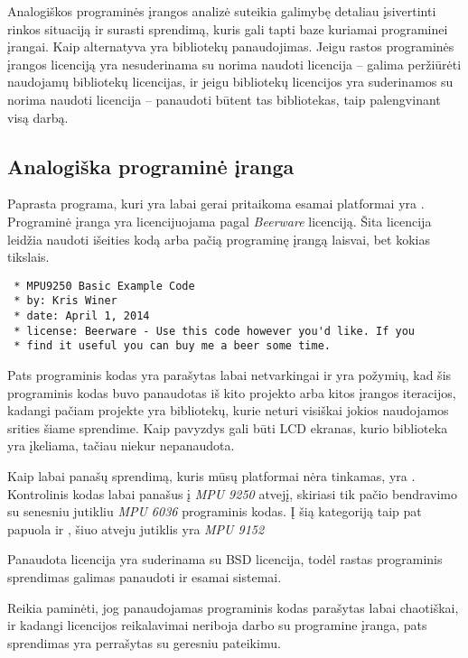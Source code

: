 Analogiškos programinės įrangos analizė suteikia galimybę detaliau įsivertinti rinkos situaciją ir surasti sprendimą, kuris gali tapti baze kuriamai programinei įrangai.
Kaip alternatyva yra bibliotekų panaudojimas.
Jeigu rastos programinės įrangos licenciją yra nesuderinama su norima naudoti licencija -- galima peržiūrėti naudojamų bibliotekų licencijas, ir jeigu bibliotekų licencijos yra suderinamos su norima naudoti licencija -- panaudoti būtent tas bibliotekas, taip palengvinant visą darbą.

\subsection{Analogiška programinė įranga}

Paprasta programa, kuri yra labai gerai pritaikoma esamai platformai yra \cite{MPU9243:online}. Programinė įranga yra licencijuojama pagal \textit{Beerware} licenciją. Šita licencija leidžia naudoti išeities kodą arba pačią programinę įrangą laisvai, bet kokias tikslais.

\begin{verbatim}
 * MPU9250 Basic Example Code
 * by: Kris Winer
 * date: April 1, 2014
 * license: Beerware - Use this code however you'd like. If you
 * find it useful you can buy me a beer some time.
\end{verbatim}

Pats programinis kodas yra parašytas labai netvarkingai ir yra požymių, kad šis programinis kodas buvo panaudotas iš kito projekto arba kitos įrangos iteracijos, kadangi pačiam projekte yra bibliotekų, kurie neturi visiškai jokios naudojamos srities šiame sprendime. Kaip pavyzdys gali būti LCD ekranas, kurio biblioteka yra įkeliama, tačiau niekur nepanaudota.

Kaip labai panašų sprendimą, kuris mūsų platformai nėra tinkamas, yra \cite{MPU6036:online}. Kontrolinis kodas labai panašus į \textit{MPU 9250} atvejį, skiriasi tik pačio bendravimo su senesniu jutikliu \textit{MPU 6036} programinis kodas. Į šią kategoriją taip pat papuola ir \cite{MPU9152:online}, šiuo atveju jutiklis yra \textit{MPU 9152}

Panaudota licencija yra suderinama su BSD licencija, todėl rastas programinis sprendimas galimas panaudoti ir esamai sistemai.

Reikia paminėti, jog panaudojamas programinis kodas parašytas labai chaotiškai, ir kadangi licencijos reikalavimai neriboja darbo su programine įranga, pats sprendimas yra perrašytas su geresniu pateikimu.